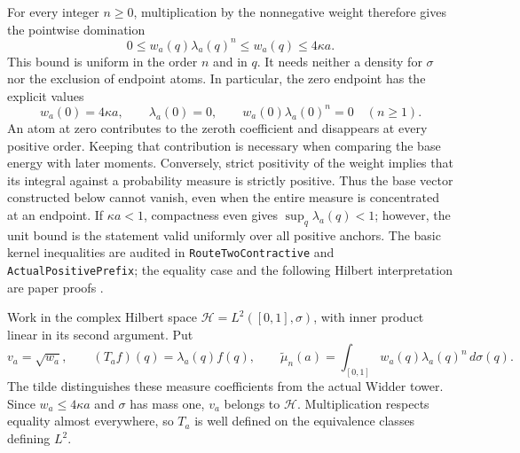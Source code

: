 For every integer $n\geq0$, multiplication by the nonnegative weight
therefore gives the pointwise domination
\begin{equation}
 0\leq w_a(q)\lambda_a(q)^n\leq w_a(q)\leq4\kappa a.
\end{equation}
This bound is uniform in the order $n$ and in $q$. It needs neither a
density for $\sigma$ nor the exclusion of endpoint atoms. In particular,
the zero endpoint has the explicit values
\begin{equation}
 w_a(0)=4\kappa a,\qquad \lambda_a(0)=0,\qquad
 w_a(0)\lambda_a(0)^n=0\quad(n\geq1).
\end{equation}
An atom at zero contributes to the zeroth coefficient and disappears at
every positive order. Keeping that contribution is necessary when comparing
the base energy with later moments. Conversely, strict positivity of the
weight implies that its integral against a probability measure is strictly
positive. Thus the base vector constructed below cannot vanish, even when
the entire measure is concentrated at an endpoint. If $\kappa a<1$, compactness even gives
$\sup_q\lambda_a(q)<1$; however, the unit bound is the statement valid
uniformly over all positive anchors. The basic kernel inequalities are
audited in \texttt{RouteTwoContractive} and \texttt{ActualPositivePrefix};
the equality case and the following Hilbert interpretation are paper proofs
\cite{source}.

\label{front:l2}

Work in the complex Hilbert space $\mathcal H=L^2([0,1],\sigma)$, with
inner product linear in its second argument. Put
\begin{equation}
 v_a=\sqrt{w_a},\qquad (T_af)(q)=\lambda_a(q)f(q),\qquad
 \widetilde\mu_n(a)=\int_{[0,1]}w_a(q)\lambda_a(q)^n\,d\sigma(q).
\end{equation}
The tilde distinguishes these measure coefficients from the actual Widder
tower. Since $w_a\leq4\kappa a$ and $\sigma$ has mass one, $v_a$ belongs
to $\mathcal H$. Multiplication respects equality almost everywhere, so
$T_a$ is well defined on the equivalence classes defining $L^2$.


